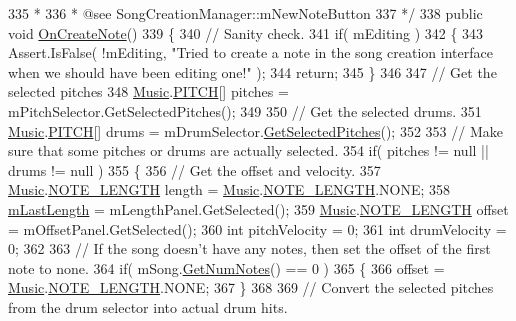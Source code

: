 \begin{DoxyCodeInclude}
335 \textcolor{comment}{     * }
336 \textcolor{comment}{     * @see SongCreationManager::mNewNoteButton}
337 \textcolor{comment}{    */}
338     \textcolor{keyword}{public} \textcolor{keywordtype}{void} \hyperlink{group___s_c_m_handlers_gaed512eb78e060a40616e6e31ce029440}{OnCreateNote}()
339     \{
340         \textcolor{comment}{// Sanity check.}
341         \textcolor{keywordflow}{if}( mEditing )
342         \{
343             Assert.IsFalse( !mEditing, \textcolor{stringliteral}{"Tried to create a note in the song creation interface when we
       should have been editing one!"} );
344             \textcolor{keywordflow}{return};
345         \}
346 
347         \textcolor{comment}{// Get the selected pitches}
348         \hyperlink{class_music}{Music}.\hyperlink{group___music_enums_ga508f69b199ea518f935486c990edac1d}{PITCH}[] pitches = mPitchSelector.GetSelectedPitches();
349 
350         \textcolor{comment}{// Get the selected drums.}
351         \hyperlink{class_music}{Music}.\hyperlink{group___music_enums_ga508f69b199ea518f935486c990edac1d}{PITCH}[] drums = mDrumSelector.\hyperlink{group___s_c___p_s_c_pub_func_ga05750cc6e1199f1522f8b87d6579dc34}{GetSelectedPitches}();
352 
353         \textcolor{comment}{// Make sure that some pitches or drums are actually selected.}
354         \textcolor{keywordflow}{if}( pitches != null || drums != null )
355         \{
356             \textcolor{comment}{// Get the offset and velocity.}
357             \hyperlink{class_music}{Music}.\hyperlink{group___music_enums_gaf11b5f079adbb21c800b9eca1c5c3cbd}{NOTE\_LENGTH} length = \hyperlink{class_music}{Music}.\hyperlink{group___music_enums_gaf11b5f079adbb21c800b9eca1c5c3cbd}{NOTE\_LENGTH}.NONE;
358             \hyperlink{group___s_c_m_priv_var_gaa137adb1c99e9ee59adcfbf7d0cf6249}{mLastLength} = mLengthPanel.GetSelected();
359             \hyperlink{class_music}{Music}.\hyperlink{group___music_enums_gaf11b5f079adbb21c800b9eca1c5c3cbd}{NOTE\_LENGTH} offset = mOffsetPanel.GetSelected();
360             \textcolor{keywordtype}{int} pitchVelocity = 0;
361             \textcolor{keywordtype}{int} drumVelocity = 0;
362 
363             \textcolor{comment}{// If the song doesn't have any notes, then set the offset of the first note to none.}
364             \textcolor{keywordflow}{if}( mSong.\hyperlink{group___song_pub_func_gad124d0af146885327f8ac455bc013b63}{GetNumNotes}() == 0 )
365             \{
366                 offset = \hyperlink{class_music}{Music}.\hyperlink{group___music_enums_gaf11b5f079adbb21c800b9eca1c5c3cbd}{NOTE\_LENGTH}.NONE;
367             \}
368 
369             \textcolor{comment}{// Convert the selected pitches from the drum selector into actual drum hits.}

\end{DoxyCodeInclude}
